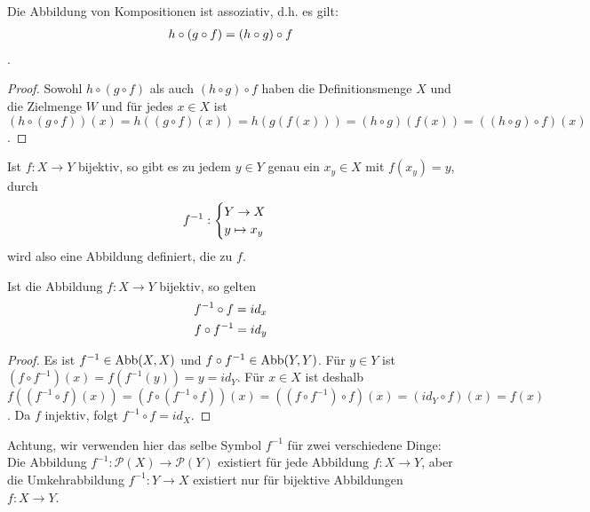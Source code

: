 \begin{proposition}
	Die Abbildung von Kompositionen ist assoziativ, d.h. es gilt: 
	\begin{align}
		h \circ (g \circ f) = (h \circ g)\circ f\notag
	\end{align}.
\end{proposition}
\begin{proof}
	Sowohl $h\circ (g\circ f)$ als auch $(h\circ g)\circ f$ haben die Definitionsmenge $X$ und die Zielmenge 
	$W$ und für jedes $x\in X$ ist $(h\circ (g\circ f))(x)=h((g\circ f)(x))=h(g(f(x)))=(h\circ g)(f(x)) = 
	((h\circ g)\circ f)(x)$.
\end{proof}

\begin{definition}[Umkehrabbildung]
	Ist $f: X \to Y$ bijektiv, so gibt es zu jedem $y \in Y$
	genau ein $x_y \in X$ mit $f(x_y)=y$, durch 
	\begin{align}
		f^{-1}: \begin{cases}
		Y \to X \\ y \mapsto x_y
		\end{cases}\notag
	\end{align} wird also eine 
	Abbildung definiert, die  zu $f$. 
\end{definition}

\begin{proposition}
	Ist die Abbildung $f: X \to Y$ bijektiv, so gelten
	\begin{align}
		f^{-1} \circ f = id_x \notag \\
		f \circ f^{-1} = id_y \notag
	\end{align}
\end{proposition}
\begin{proof}
	Es ist $f^{-1}\in \operatorname{Abb}(X,X)$ und $f\circ f^{-1}\in \operatorname{Abb}(Y,Y)$. Für $y\in Y$ ist $(f\circ f^{-1})(x)=
	f(f^{-1}(y))=y=id_Y$. Für $x\in X$ ist deshalb $f((f^{-1}\circ f)(x))=(f\circ (f^{-1}\circ f))(x)=
	((f\circ f^{-1})\circ f)(x)=(id_Y \circ f)(x)=f(x)$. Da $f$ injektiv, folgt $f^{-1}\circ f=id_X$.
\end{proof}

\begin{remark}
	Achtung, wir verwenden hier das selbe Symbol $f^{-1}$ für zwei verschiedene Dinge: Die Abbildung
	$f^{-1}: \mathcal P(X) \to \mathcal P(Y)$ existiert für jede Abbildung $f: X \to Y$, aber die
	Umkehrabbildung $f^{-1}: Y \to X$ existiert nur für bijektive Abbildungen $f: X \to Y$.
\end{remark}

